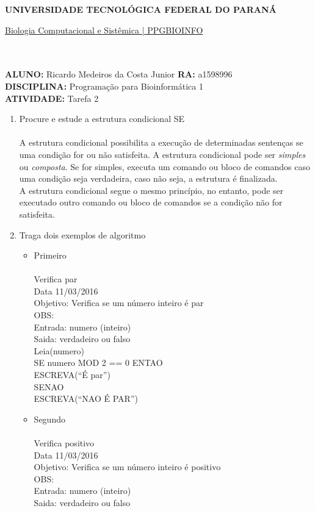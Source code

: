 \documentclass[a4paper, 12pt]{article}
\begin{document}
\textbf{UNIVERSIDADE TECNOLÓGICA FEDERAL DO PARANÁ}\\
\centerline{\underline{Biologia Computacional e Sistêmica | PPGBIOINFO}}\\\\
\textbf{ALUNO:} Ricardo Medeiros da Costa Junior   \textbf{RA:} a1598996 \\
\textbf{DISCIPLINA:} Programação para Bioinformática 1 \\
\textbf{ATIVIDADE:} Tarefa 2 \\
\begin{enumerate} 
\item Procure e estude a estrutura condicional SE \\\\
  A estrutura condicional possibilita a execução de determinadas sentenças se uma condição for ou não satisfeita. A estrutura condicional pode ser \emph{simples} ou \emph{composta}. Se for simples, executa um comando ou bloco de comandos caso uma condição seja verdadeira, caso não seja, a estrutura é finalizada.\\
  A estrutura condicional segue o mesmo princípio, no entanto, pode ser executado outro comando ou bloco de comandos se a condição não for satisfeita. 
\item Traga dois exemplos de algoritmo
  \begin{itemize}
    \item Primeiro \\\\
    Verifica par \\
Data 11/03/2016 \\
Objetivo: Verifica se um número inteiro é par \\
OBS:\\
Entrada: numero (inteiro)\\
Saida: verdadeiro ou falso\\

Leia(numero)\\

SE numero MOD 2 == 0 ENTAO\\
ESCREVA(``É par'')\\
SENAO\\
ESCREVA(``NAO É PAR'')\\

\item Segundo\\\\
      Verifica positivo \\
Data 11/03/2016 \\
Objetivo: Verifica se um número inteiro é positivo \\
OBS:\\
Entrada: numero (inteiro)\\
Saida: verdadeiro ou falso\\


\end{itemize}
\end{enumerate}
\end{document}
